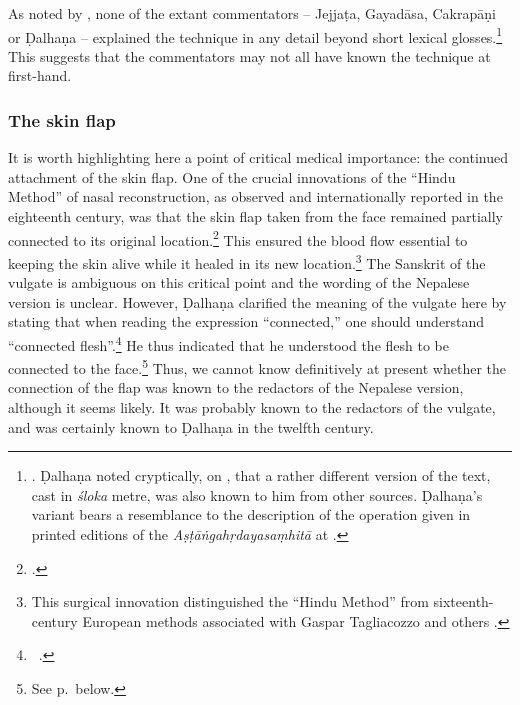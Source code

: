 As noted by \citeauthor{meul-hist}, none of the extant commentators -- Jejjaṭa,
Gayadāsa, Cakrapāṇi or Ḍalhaṇa -- explained the technique in any detail beyond
short lexical glosses.\footnote{\cite[IB, 328]{meul-hist}. Ḍalhaṇa noted cryptically, on
    , that a rather different version of the
    text, cast in \emph{śloka} metre, was also known to him from other sources.
    Ḍalhaṇa's variant bears a resemblance to the description of the operation given in
    printed editions of the \emph{Aṣṭāṅgahṛdayasaṃhitā} at .}
    This suggests that the commentators may not all have known the technique at
    first-hand. %

\subsubsection{The skin flap} \label{skinflap} It is worth highlighting here a
point of critical medical importance: the continued attachment of the skin flap.
One of the crucial innovations of the “Hindu Method” of nasal reconstruction, as
observed  and internationally reported in the eighteenth century, was that the
skin flap taken from the face remained partially connected to its original
location.\footcite[See][67--70]{wuja-2003} This ensured the blood flow essential
to keeping the skin alive while it healed in its new location.\footnote{This
    surgical innovation distinguished the “Hindu Method” from sixteenth-century
    European methods associated with Gaspar Tagliacozzo and others \citep[see,
    e.g.,][\emph{passim}]{carp-acco}.}  The Sanskrit of the vulgate is ambiguous on
    this critical point and the wording of the Nepalese version is unclear. However,
    Ḍalhaṇa clarified the meaning of the vulgate here by stating that when reading the
    expression “connected,” one should understand “connected flesh”.\footnote{\SS\
        .}  He thus indicated that he understood the flesh to be connected
        to the face.\footnote{See p.\,\pageref{well-joined} below.}  Thus, we cannot know
            definitively at present whether the connection of the flap was known to the
            redactors of the Nepalese version, although it seems likely.  It was probably
            known to the redactors of the vulgate, and was certainly known to Ḍalhaṇa in the
            twelfth century.
        
